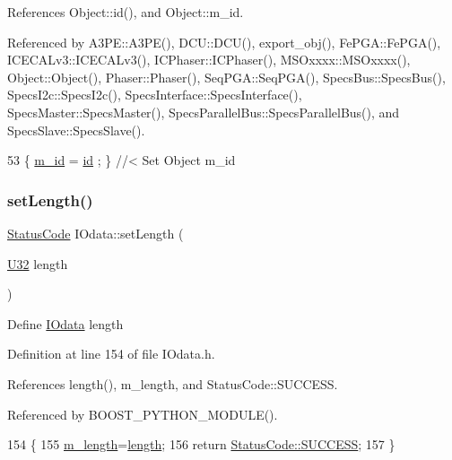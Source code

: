 References Object\+::id(), and Object\+::m\+\_\+id.



Referenced by A3\+P\+E\+::\+A3\+P\+E(), D\+C\+U\+::\+D\+C\+U(), export\+\_\+obj(), Fe\+P\+G\+A\+::\+Fe\+P\+G\+A(), I\+C\+E\+C\+A\+Lv3\+::\+I\+C\+E\+C\+A\+Lv3(), I\+C\+Phaser\+::\+I\+C\+Phaser(), M\+S\+Oxxxx\+::\+M\+S\+Oxxxx(), Object\+::\+Object(), Phaser\+::\+Phaser(), Seq\+P\+G\+A\+::\+Seq\+P\+G\+A(), Specs\+Bus\+::\+Specs\+Bus(), Specs\+I2c\+::\+Specs\+I2c(), Specs\+Interface\+::\+Specs\+Interface(), Specs\+Master\+::\+Specs\+Master(), Specs\+Parallel\+Bus\+::\+Specs\+Parallel\+Bus(), and Specs\+Slave\+::\+Specs\+Slave().


\begin{DoxyCode}
53 \{ \hyperlink{classObject_aca74b9dbfed7b5556ea2d56c65b6b6b0}{m\_id}    = \hyperlink{classObject_af99145335cc61ff6e2798ea17db009d2}{id}    ; \} \textcolor{comment}{//< Set Object m\_id}
\end{DoxyCode}
\mbox{\label{classIOdata_affaf98e7f9e596263e914b055f8f93c2}} 
\subsubsection{\texorpdfstring{set\+Length()}{setLength()}}
{\footnotesize\ttfamily \hyperlink{classStatusCode}{Status\+Code} I\+Odata\+::set\+Length (\begin{DoxyParamCaption}\item[{\hyperlink{classIOdata_a96fb57f5fcd87b708743abd3c86a5198}{U32}}]{length }\end{DoxyParamCaption})\hspace{0.3cm}{\ttfamily [inline]}}

Define \hyperlink{classIOdata}{I\+Odata} length 

Definition at line 154 of file I\+Odata.\+h.



References length(), m\+\_\+length, and Status\+Code\+::\+S\+U\+C\+C\+E\+SS.



Referenced by B\+O\+O\+S\+T\+\_\+\+P\+Y\+T\+H\+O\+N\+\_\+\+M\+O\+D\+U\+L\+E().


\begin{DoxyCode}
154                                   \{
155     \hyperlink{classIOdata_afabe57441da019eb614d277799106aac}{m\_length}=\hyperlink{classIOdata_abb40e71ce0290832a24857b4a1e7b1a3}{length};
156     \textcolor{keywordflow}{return} \hyperlink{classStatusCode_a6f565cbeadc76d14c72f047e5e85eb4badd0da38d3ba0d922efd1f4619bc37ad8}{StatusCode::SUCCESS};
157   \}
\end{DoxyCode}
\mbox{\label{classIOdata_ad81e9fd3f2cd9dcaffd9eabddf8f867e}} 
